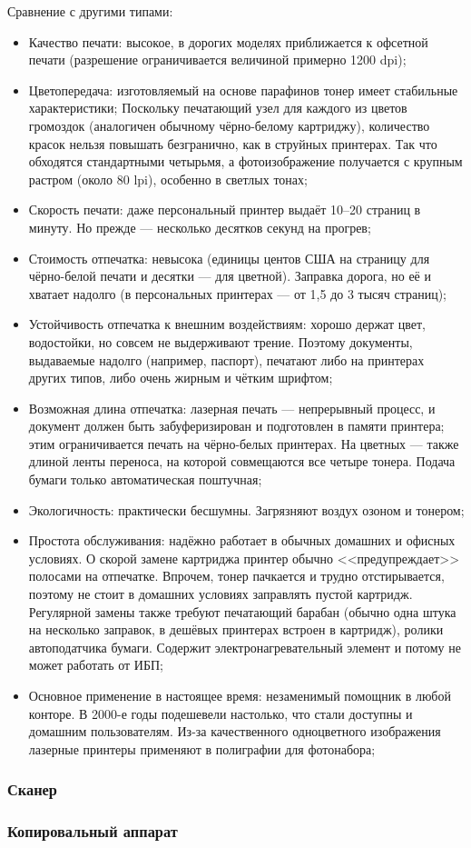 \begin{itemize}
 Сравнение с другими типами:
 \begin{itemize}
  \item Качество печати: высокое, в дорогих моделях приближается к офсетной печати (разрешение ограничивается величиной примерно 1200 dpi);
  \item Цветопередача: изготовляемый на основе парафинов тонер имеет стабильные характеристики; Поскольку печатающий узел для каждого из цветов громоздок (аналогичен обычному чёрно-белому картриджу), количество красок нельзя повышать безгранично, как в струйных принтерах. Так что обходятся стандартными четырьмя, а фотоизображение получается с крупным растром (около 80 lpi), особенно в светлых тонах;
  \item Скорость печати: даже персональный принтер выдаёт 10--20 страниц в минуту. Но прежде --- несколько десятков секунд на прогрев;
  \item Стоимость отпечатка: невысока (единицы центов США на страницу для чёрно-белой печати и десятки --- для цветной). Заправка дорога, но её и хватает надолго (в персональных принтерах --- от 1,5 до 3 тысяч страниц);
  \item Устойчивость отпечатка к внешним воздействиям: хорошо держат цвет, водостойки, но совсем не выдерживают трение. Поэтому документы, выдаваемые надолго (например, паспорт), печатают либо на принтерах других типов, либо очень жирным и чётким шрифтом;
  \item Возможная длина отпечатка: лазерная печать --- непрерывный процесс, и документ должен быть забуферизирован и подготовлен в памяти принтера; этим ограничивается печать на чёрно-белых принтерах. На цветных --- также длиной ленты переноса, на которой совмещаются все четыре тонера. Подача бумаги только автоматическая поштучная;
  \item Экологичность: практически бесшумны. Загрязняют воздух озоном и тонером;
  \item Простота обслуживания: надёжно работает в обычных домашних и офисных условиях. О скорой замене картриджа принтер обычно <<предупреждает>> полосами на отпечатке. Впрочем, тонер пачкается и трудно отстирывается, поэтому не стоит в домашних условиях заправлять пустой картридж. Регулярной замены также требуют печатающий барабан (обычно одна штука на несколько заправок, в дешёвых принтерах встроен в картридж), ролики автоподатчика бумаги. Содержит электронагревательный элемент и потому не может работать от ИБП;
  \item Основное применение в настоящее время: незаменимый помощник в любой конторе. В 2000-е годы подешевели настолько, что стали доступны и домашним пользователям. Из-за качественного одноцветного изображения лазерные принтеры применяют в полиграфии для фотонабора; 
 \end{itemize}
\end{itemize}

\subsubsection{Сканер}\label{base:introduction:components:printers:scanner}

\subsubsection{Копировальный аппарат}\label{base:introduction:components:printers:copier}

